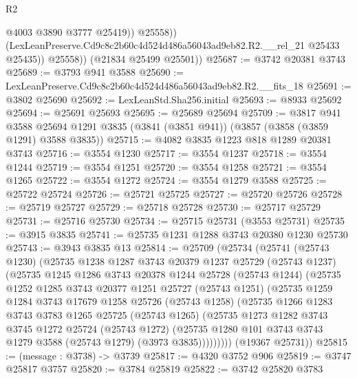 \begin{lexlean}{R2}
\begin{coremodule}
                    @4003
                    @3890
                    @3777
                    @25419))
                @25558))
            (LexLeanPreserve.Cd9c8c2b60c4d524d486a56043ad9eb82.R2.__rel_21 @25433 @25435))
          @25558))
      (@21834 @25499 @25501))
@25687 := @3742 @20381 @3743
@25689 := @3793 @941 @3588
@25690 := LexLeanPreserve.Cd9c8c2b60c4d524d486a56043ad9eb82.R2.__fits_18
@25691 := @3802 @25690
@25692 := LexLeanStd.Sha256.initial
@25693 := @8933 @25692
@25694 := @25691 @25693
@25695 := @25689 @25694
@25709 := @3817
    @941
    @3588
    @25694
    @1291
    @3835
    (@3841 (@3851 @941))
    (@3857 (@3858 (@3859 @1291) @3588 @3835))
@25715 := @4082 @3835 @1223 @818 @1289 @20381 @3743
@25716 := @3554 @1230
@25717 := @3554 @1237
@25718 := @3554 @1244
@25719 := @3554 @1251
@25720 := @3554 @1258
@25721 := @3554 @1265
@25722 := @3554 @1272
@25724 := @3554 @1279 @3588
@25725 := @25722 @25724
@25726 := @25721 @25725
@25727 := @25720 @25726
@25728 := @25719 @25727
@25729 := @25718 @25728
@25730 := @25717 @25729
@25731 := @25716 @25730
@25734 := @25715 @25731 (@3553 @25731)
@25735 := @3915 @3835
@25741 := @25735 @1231 @1288 @3743 @20380 @1230 @25730
@25743 := @3943 @3835 @13
@25814 := @25709
    (@25734
      (@25741
        (@25743 @1230)
        (@25735
          @1238
          @1287
          @3743
          @20379
          @1237
          @25729
          (@25743 @1237)
          (@25735
            @1245
            @1286
            @3743
            @20378
            @1244
            @25728
            (@25743 @1244)
            (@25735
              @1252
              @1285
              @3743
              @20377
              @1251
              @25727
              (@25743 @1251)
              (@25735
                @1259
                @1284
                @3743
                @17679
                @1258
                @25726
                (@25743 @1258)
                (@25735
                  @1266
                  @1283
                  @3743
                  @3783
                  @1265
                  @25725
                  (@25743 @1265)
                  (@25735
                    @1273
                    @1282
                    @3743
                    @3745
                    @1272
                    @25724
                    (@25743 @1272)
                    (@25735 @1280 @101 @3743 @3743 @1279 @3588 (@25743 @1279) (@3973 @3835)))))))))
      (@19367 @25731))
@25815 := (message : @3738) -> @3739
@25817 := @4320 @3752 @906
@25819 := @3747 @25817 @3757
@25820 := @3784 @25819
@25822 := @3742 @25820 @3783

\end{coremodule}
\end{lexlean}
